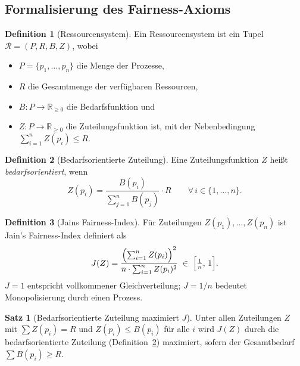 ﻿\documentclass[a4paper,12pt]{article}
\theoremstyle{definition}
\newtheorem{definition}{Definition}
\newtheorem{satz}{Satz}
\begin{document}
\subsection{Formalisierung des Fairness-Axioms}

\begin{definition}[Ressourcensystem]
Ein Ressourcensystem ist ein Tupel $\mathcal{R} = (P, R, B, Z)$, wobei
\begin{itemize}
  \item $P = \{p_1, \ldots, p_n\}$ die Menge der Prozesse,
  \item $R$ die Gesamtmenge der verfügbaren Ressourcen,
  \item $B: P \to \mathbb{R}_{\geq 0}$ die Bedarfsfunktion und
  \item $Z: P \to \mathbb{R}_{\geq 0}$ die Zuteilungsfunktion ist,
        mit der Nebenbedingung $\sum_{i=1}^n Z(p_i) \leq R$.
\end{itemize}
\end{definition}

\begin{definition}[Bedarfsorientierte Zuteilung]
\label{def:bod}
Eine Zuteilungsfunktion $Z$ heißt \emph{bedarfsorientiert}, wenn
\[
  Z(p_i) = \frac{B(p_i)}{\sum_{j=1}^n B(p_j)} \cdot R
  \qquad \forall\, i \in \{1, \ldots, n\}.
\]
\end{definition}

\begin{definition}[Jains Fairness-Index]
\label{def:jain}
Für Zuteilungen $Z(p_1), \ldots, Z(p_n)$ ist Jain's Fairness-Index
\cite{jain1984quantitative} definiert als
\[
  J(Z) = \frac{\Bigl(\sum_{i=1}^n Z(p_i)\Bigr)^2}
              {n \cdot \sum_{i=1}^n Z(p_i)^2}
  \;\in\; \Bigl[\tfrac{1}{n},\, 1\Bigr].
\]
$J = 1$ entspricht vollkommener Gleichverteilung;
$J = 1/n$ bedeutet Monopolisierung durch einen Prozess.
\end{definition}

\begin{satz}[Bedarfsorientierte Zuteilung maximiert $J$]
\label{satz:jain_max}
Unter allen Zuteilungen $Z$ mit $\sum Z(p_i) = R$ und
$Z(p_i) \leq B(p_i)$ für alle $i$ wird $J(Z)$ durch die
bedarfsorientierte Zuteilung (Definition~\ref{def:bod}) maximiert,
sofern der Gesamtbedarf $\sum B(p_i) \geq R$.
\end{satz}
\end{document}
